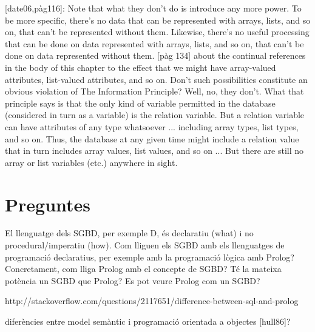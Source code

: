 [date06,pàg116]:
Note that what they don’t do is introduce any more power. To be more specific, there’s no data that can
be represented with arrays, lists, and so on, that can’t be represented without them. Likewise, there’s no
useful processing that can be done on data represented with arrays, lists, and so on, that can’t be done
on data represented without them.
[pàg 134]
about the continual references in the body of this chapter to the effect that we might have
array-valued attributes, list-valued attributes, and so on. Don’t such possibilities constitute an
obvious violation of The Information Principle?
     Well, no, they don’t. What that principle says is that the only kind of variable permitted in
the database (considered in turn as a variable) is the relation variable. But a relation variable
can have attributes of any type whatsoever ... including array types, list types, and so on.
Thus, the database at any given time might include a relation value that in turn includes array
values, list values, and so on ... But there are still no array or list variables (etc.) anywhere in sight.









\section{Preguntes}

El llenguatge dels SGBD, per exemple D, és declaratiu (what) i no procedural/imperatiu (how). Com lliguen els SGBD amb els llenguatges de programació declaratius, per exemple amb la programació lògica amb Prolog? Concretament, com lliga Prolog amb el concepte de SGBD? Té la mateixa potència un SGBD que Prolog?
 Es pot veure Prolog com un SGBD?

http://stackoverflow.com/questions/2117651/difference-between-sql-and-prolog

diferències entre model semàntic i programació orientada a objectes [hull86]?








